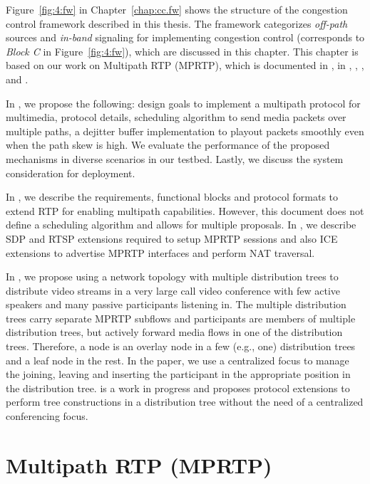 Figure~\ref{fig:4:fw} in Chapter~\ref{chap:cc.fw} shows the structure of the
congestion control framework described in this thesis. The framework
categorizes \emph{off-path} sources and \emph{in-band} signaling for
implementing congestion control (corresponds to \emph{Block C} in
Figure~\ref{fig:4:fw}), which are discussed in this chapter. This chapter is
based on our work on Multipath RTP (MPRTP), which is documented in
, in \cite{draft.mprtp}, \cite{draft.mprtp.sdp},
\cite{Globisch:AsymGrpComm}, and \cite{draft.rtcp.overlay}.

In , we propose the following: design goals to implement a
multipath protocol for multimedia, protocol details, scheduling algorithm to
send media packets over multiple paths, a dejitter buffer implementation to
playout packets smoothly even when the path skew is high. We evaluate the
performance of the proposed mechanisms in diverse scenarios in our testbed.
Lastly, we discuss the system consideration for deployment.

In \cite{draft.mprtp}, we describe the requirements, functional blocks and
protocol formats to extend RTP for enabling multipath capabilities. However,
this document does not define a scheduling algorithm and allows for multiple
proposals. In \cite{draft.mprtp.sdp}, we describe SDP and RTSP extensions
required to setup MPRTP sessions and also ICE extensions to advertise MPRTP
interfaces and perform NAT traversal.

In \cite{Globisch:AsymGrpComm}, we propose using a network topology with
multiple distribution trees to distribute video streams in a very large call
video conference with few active speakers and many passive participants
listening in. The multiple distribution trees carry separate MPRTP subflows
and participants are members of multiple distribution trees, but actively
forward media flows in one of the distribution trees. Therefore, a node is an
overlay node in a few (e.g., one) distribution trees and a leaf node in the
rest. In the paper, we use a centralized focus to manage the joining, leaving
and inserting the participant in the appropriate position in the distribution
tree. \cite{draft.rtcp.overlay} is a work in progress and proposes protocol
extensions to perform tree constructions in a distribution tree without the
need of a centralized conferencing focus.


\section{Multipath RTP (MPRTP)}

